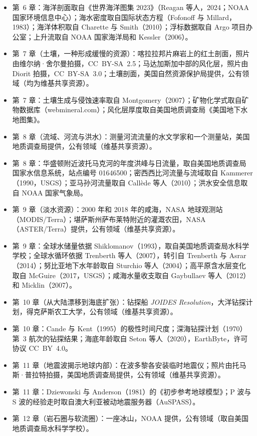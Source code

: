 \begin{itemize}
  \item 第~6 章：海洋剖面取自《世界海洋图集 2023》（Reagan 等人，2024；NOAA 国家环境信息中心）；海水密度取自国际状态方程（Fofonoff 与 Millard，1983）；海洋体积取自 Charette 与 Smith（2010）；浮标数据取自 Argo 项目办公室；上升流取自 NOAA 国家海洋局和 Kessler（2006）。
  \item 第~7 章（土壤，一种形成缓慢的资源）：喀拉拉邦片麻岩上的红土剖面，照片由维尔纳·舍尔曼拍摄，CC~BY-SA~2.5；马达加斯加中部的风化层，照片由 Diorit 拍摄，CC~BY-SA~3.0；土壤剖面，美国自然资源保护局提供，公有领域（均为维基共享资源）。
  \item 第~7 章：土壤生成与侵蚀速率取自 Montgomery（2007）；矿物化学式取自矿物数据库（webmineral.com）；风化层厚度取自美国地质调查局《美国地下水地图集》。
  \item 第~8 章（流域、河流与洪水）：测量河流流量的水文学家和一个测量站，美国地质调查局提供，公有领域（维基共享资源）。
  \item 第~8 章：华盛顿附近波托马克河的年度洪峰与日流量，取自美国地质调查局国家水信息系统，站点编号 01646500；密西西比河流量与流域取自 Kammerer（1990，USGS）；亚马孙河流量取自 Callède 等人（2010）；洪水安全信息取自 NOAA 国家气象局。
  \item 第~9 章（淡水资源）：2000 年和 2018 年的咸海，NASA 地球观测站（MODIS/Terra）；堪萨斯州萨布莱特附近的灌溉农田，NASA（ASTER/Terra）提供，公有领域（维基共享资源）。
  \item 第~9 章：全球水储量依据 Shiklomanov（1993），取自美国地质调查局水科学学校；全球水循环依据 Trenberth 等人（2007），转引自 Trenberth 与 Asrar（2014）；努比亚地下水年龄取自 Sturchio 等人（2004）；高平原含水层变化取自 McGuire（2017，USGS）；咸海水量收支取自 Gaybullaev 等人（2012）和 Micklin（2007）。
  \item 第~10 章（从大陆漂移到海底扩张）：钻探船 \emph{JOIDES Resolution}，大洋钻探计划，得克萨斯农工大学，公有领域（维基共享资源）。
  \item 第~10 章：Cande 与 Kent（1995）的极性时间尺度；深海钻探计划（1970）第~3 航次的钻探结果；海底年龄取自 Seton 等人（2020），EarthByte，许可协议 CC~BY~4.0。
  \item 第~11 章（地震波揭示地球内部）：在波多黎各安装临时地震仪；照片由托马斯·普拉特拍摄，美国地质调查局提供，公有领域（维基共享资源）。
  \item 第~11 章：Dziewonski 与 Anderson（1981）的《初步参考地球模型》；P 波与 S 波的经验走时取自澳大利亚被动地震服务器（AuSPASS）。
  \item 第~12 章（岩石圈与软流圈）：一座冰山，NOAA 提供，公有领域（取自美国地质调查局水科学学校）。

\end{itemize}
